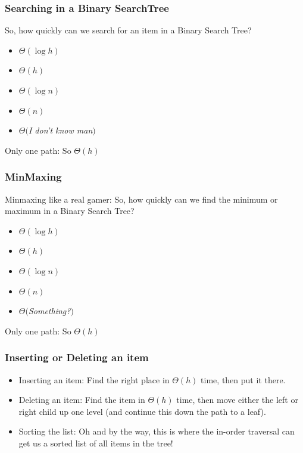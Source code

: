 \begin{frame}
	\frametitle{Searching in a Binary SearchTree}
	
			So, how quickly can we search for an item in a Binary Search Tree?
			\begin{itemize}
				\item $\Theta(\log h)$
				\item $\Theta(h)$
				\item $\Theta(\log n)$
				\item $\Theta(n)$
				\item $\Theta($\textit{I don't know man}$)$
			\end{itemize}
		
		Only one path:	So $\Theta(h)$

		
		

\end{frame}

\begin{frame}
	\frametitle{MinMaxing}
	
Minmaxing like a real gamer:	So, how quickly can we find the minimum or maximum in a Binary Search Tree?
			\begin{itemize}
				\item $\Theta(\log h)$
				\item $\Theta(h)$
				\item $\Theta(\log n)$
				\item $\Theta(n)$
				\item $\Theta($\textit{Something?}$)$
			\end{itemize}

		Only one path:	So $\Theta(h)$

		
	
\end{frame}

\begin{frame}
	\frametitle{Inserting or Deleting an item}

			\begin{itemize}
				\item Inserting an item:	Find the right place in $\Theta(h)$ time, then put it there.
				\item Deleting an item:	Find the item in $\Theta(h)$ time, then move either the left or right child up one level (and continue this down the
		path to a leaf).
				\item Sorting the list:		Oh and by the way, this is where the in-order traversal can get us a sorted list of all items in the tree!
		\end{itemize}	
\end{frame}

